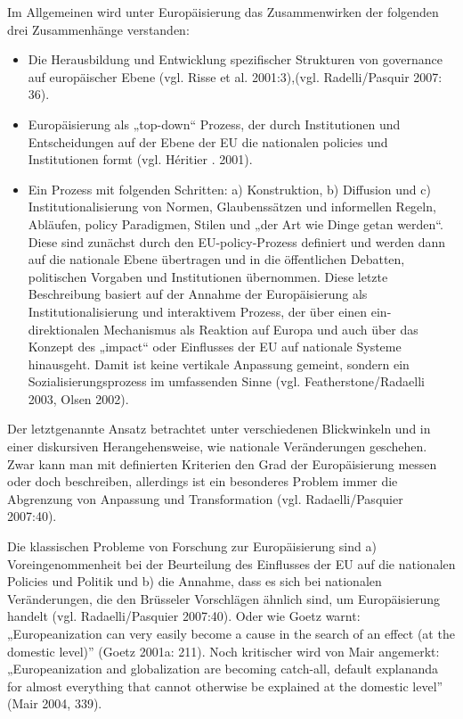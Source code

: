 Im Allgemeinen wird unter Europäisierung das Zusammenwirken der folgenden drei Zusammenhänge verstanden: 
\begin{itemize}
\item Die Herausbildung und Entwicklung spezifischer Strukturen von governance auf europäischer Ebene (vgl. Risse et al. 2001:3),(vgl. Radelli/Pasquir 2007: 36).
\item Europäisierung als „top-down“ Prozess, der durch Institutionen und Entscheidungen auf der Ebene der EU die nationalen policies und Institutionen formt (vgl. Héritier . 2001).
\item Ein Prozess mit folgenden Schritten: a) Konstruktion, b) Diffusion und c) Institutionalisierung von Normen, Glaubenssätzen und informellen Regeln, Abläufen, policy Paradigmen, Stilen und „der Art wie Dinge getan werden“. Diese sind zunächst durch den EU-policy-Prozess definiert und werden dann auf die nationale Ebene übertragen und in die öffentlichen Debatten, politischen Vorgaben und Institutionen übernommen. Diese letzte Beschreibung basiert auf der Annahme der Europäisierung als Institutionalisierung und interaktivem Prozess, der über einen ein-direktionalen Mechanismus als Reaktion auf Europa und auch über das Konzept des „impact“ oder Einflusses der EU auf nationale Systeme hinausgeht. Damit ist keine vertikale Anpassung gemeint, sondern ein Sozialisierungsprozess im umfassenden Sinne (vgl. Featherstone/Radaelli 2003, Olsen 2002).
\end{itemize}
Der letztgenannte Ansatz betrachtet unter verschiedenen Blickwinkeln und in einer diskursiven Herangehensweise, wie nationale Veränderungen geschehen. Zwar kann man mit definierten Kriterien den Grad der Europäisierung messen oder doch beschreiben, allerdings ist ein besonderes Problem immer die Abgrenzung von Anpassung und Transformation (vgl. Radaelli/Pasquier 2007:40).\par
Die klassischen Probleme von Forschung zur Europäisierung sind a) Voreingenommenheit bei der Beurteilung des Einflusses der EU auf die nationalen Policies und Politik und b) die Annahme, dass es sich bei nationalen Veränderungen, die den Brüsseler Vorschlägen ähnlich sind, um Europäisierung handelt (vgl. Radaelli/Pasquier 2007:40). Oder wie Goetz warnt: „Europeanization can very easily become a cause in the search of an effect (at the domestic level)” (Goetz 2001a: 211). Noch kritischer wird von Mair angemerkt: „Europeanization and globalization are becoming catch-all, default explananda for almost everything that cannot otherwise be explained at the domestic level” (Mair 2004, 339).\par

